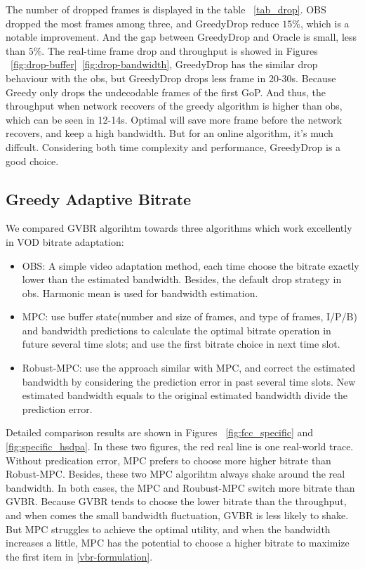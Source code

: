

The number of dropped frames is displayed in the table ~\ref{tab_drop}. OBS dropped the most frames among three, and GreedyDrop reduce $15\%$, which is a notable improvement. And the gap between GreedyDrop and Oracle is small, less than $5\%$. The real-time frame drop and throughput is showed in Figures ~\ref{fig:drop-buffer}~\ref{fig:drop-bandwidth}, GreedyDrop has the similar drop behaviour with the obs, but GreedyDrop drops less frame in 20-30s. Because Greedy only drops the undecodable frames of the first GoP. And thus, the throughput when network recovers of the greedy algorithm is higher than obs, which can be seen in 12-14s. Optimal will save more frame before the network recovers, and keep a high bandwidth. But for an online algorithm, it's much diffcult. Considering both time complexity and performance, GreedyDrop is a good choice.


\subsection{Greedy Adaptive Bitrate}

We compared GVBR algorihtm towards three algorithms which work excellently in VOD bitrate adaptation:
\begin{itemize}
  \item OBS: A simple video adaptation method, each time choose the bitrate exactly lower than the estimated bandwidth. Besides, the default drop strategy in obs. Harmonic mean is used for bandwidth estimation.
  \item MPC: use buffer state(number and size of frames, and type of frames, I/P/B) and bandwidth predictions to calculate the optimal bitrate operation in future several time slots; and use the first bitrate choice in next time slot.
  \item Robust-MPC: use the approach similar with MPC, and correct the estimated bandwidth by considering the prediction error in past several time slots. New estimated bandwidth equals to the original estimated bandwidth divide the prediction error.
\end{itemize}
Detailed comparison results are shown in Figures ~\ref{fig:fcc_specific} and \ref{fig:specific_hsdpa}. In these two figures, the red real line is one real-world trace. Without predication error, MPC prefers to choose more higher bitrate than Robust-MPC. Besides, these two MPC algorihtm always shake around the real bandwidth. In both cases, the MPC and Roubust-MPC switch more bitrate than GVBR. Because GVBR tends to choose the lower bitrate than the throughput, and when comes the small bandwidth fluctuation, GVBR is less likely to shake. But MPC struggles to achieve the optimal utility, and when the bandwidth increases a little, MPC has the potential to choose a higher bitrate to maximize the first item in \ref{vbr-formulation}.

